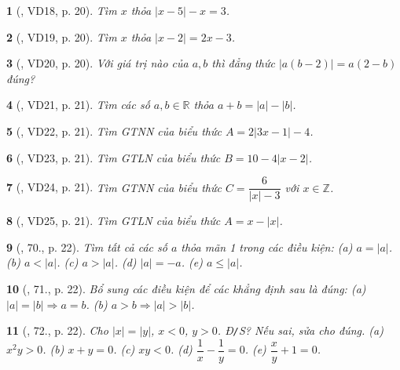 \documentclass{article}
\newtheorem{baitoan}{}
\begin{document}
\begin{baitoan}[\cite{Binh_Toan_7_tap_1}, VD18, p. 20]
	Tìm $x$ thỏa $|x - 5| - x = 3$.
\end{baitoan}

\begin{baitoan}[\cite{Binh_Toan_7_tap_1}, VD19, p. 20]
	Tìm $x$ thỏa $|x - 2| = 2x - 3$.
\end{baitoan}

\begin{baitoan}[\cite{Binh_Toan_7_tap_1}, VD20, p. 20]
	Với giá trị nào của $a,b$ thì đẳng thức $|a(b - 2)| = a(2 - b)$ đúng?
\end{baitoan}

\begin{baitoan}[\cite{Binh_Toan_7_tap_1}, VD21, p. 21]
	Tìm các số $a,b\in\mathbb{R}$ thỏa $a + b = |a| - |b|$.
\end{baitoan}

\begin{baitoan}[\cite{Binh_Toan_7_tap_1}, VD22, p. 21]
	Tìm {\rm GTNN} của biểu thức $A = 2|3x - 1| - 4$.
\end{baitoan}

\begin{baitoan}[\cite{Binh_Toan_7_tap_1}, VD23, p. 21]
	Tìm {\rm GTLN} của biểu thức $B = 10 - 4|x - 2|$.
\end{baitoan}

\begin{baitoan}[\cite{Binh_Toan_7_tap_1}, VD24, p. 21]
	Tìm {\rm GTNN} của biểu thức $C = \dfrac{6}{|x| - 3}$ với $x\in\mathbb{Z}$.
\end{baitoan}

\begin{baitoan}[\cite{Binh_Toan_7_tap_1}, VD25, p. 21]
	Tìm {\rm GTLN} của biểu thức $A = x - |x|$.
\end{baitoan}

\begin{baitoan}[\cite{Binh_Toan_7_tap_1}, 70., p. 22]
	Tìm tất cả các số $a$ thỏa mãn 1 trong các điều kiện: (a) $a = |a|$. (b) $a < |a|$. (c) $a > |a|$. (d) $|a| = -a$. (e) $a\le|a|$.	
\end{baitoan}

\begin{baitoan}[\cite{Binh_Toan_7_tap_1}, 71., p. 22]
	Bổ sung các điều kiện để các khẳng định sau là đúng: (a) $|a| = |b|\Rightarrow a = b$. (b) $a > b\Rightarrow|a| > |b|$.
\end{baitoan}

\begin{baitoan}[\cite{Binh_Toan_7_tap_1}, 72., p. 22]
	Cho $|x| = |y|$, $x < 0$, $y > 0$. {\rm Đ{\tt/}S?} Nếu sai, sửa cho đúng. (a) $x^2y > 0$. (b) $x + y = 0$. (c) $xy < 0$. (d) $\dfrac{1}{x} - \dfrac{1}{y} = 0$. (e) $\dfrac{x}{y} + 1 = 0$.	
\end{baitoan}
\end{document}
